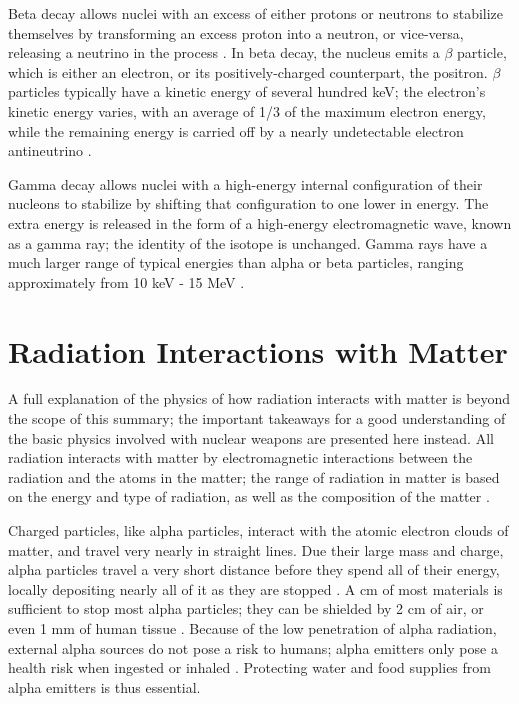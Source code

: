 \documentclass{report}
\begin{document}
Beta decay allows nuclei with an excess of either protons or neutrons to stabilize themselves by transforming an excess proton into a neutron, or vice-versa, releasing a neutrino in the process \cite{krane1987introductory}. In beta decay,  the nucleus emits a \(\beta\) particle, which is either an electron, or its positively-charged counterpart, the positron. \(\beta\) particles typically have a kinetic energy of several hundred keV;   the electron's kinetic energy varies, with an average of 1/3 of the maximum electron energy, while the remaining energy is carried off by a nearly undetectable electron antineutrino \cite{krane1987introductory}.

Gamma decay allows nuclei with a high-energy internal configuration of their nucleons to stabilize by shifting that configuration to one lower in energy. The extra energy is released in the form of a high-energy electromagnetic wave, known as a gamma ray; the identity of the isotope is unchanged. Gamma rays have a much larger range of typical energies than alpha or beta particles, ranging approximately from 10 keV - 15 MeV  \cite{krane1987introductory}.  



\section{Radiation Interactions with Matter}

A full explanation of the physics of how radiation interacts with matter is beyond the scope of this summary; the important takeaways for a good understanding of the basic physics involved with nuclear weapons are presented here instead. All radiation interacts with matter by electromagnetic interactions between the radiation and the atoms in the matter; the range of radiation in matter is based on the energy and type of radiation, as well as the composition of the matter \cite{krane1987introductory}. 

Charged particles, like alpha particles, interact with the atomic electron clouds of matter, and travel very nearly in straight lines. Due their large mass and charge, alpha particles travel a very short distance before they spend all of their energy, locally depositing nearly all of it as they are stopped \cite{krane1987introductory}. A cm of most materials is sufficient to stop most alpha particles; they can be shielded by 2 cm of air, or even 1 mm of human tissue \cite{Cember2008}. Because of the low penetration of alpha radiation, external alpha sources do not pose a risk to humans; alpha emitters only pose a health risk when ingested or inhaled \cite{CentersforDiseaseControlandPrevention}.  Protecting water and food supplies from alpha emitters is thus essential. 
\end{document}
